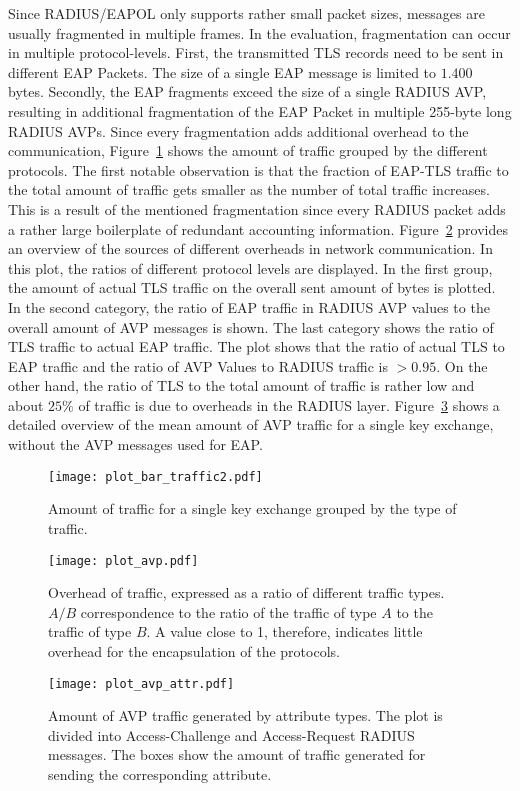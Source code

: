 Since RADIUS/EAPOL only supports rather small packet sizes, messages are usually fragmented in multiple frames. In the evaluation, fragmentation can occur in multiple protocol-levels. First, the transmitted TLS records need to be sent in different \ac{EAP} Packets. The size of a single \ac{EAP} message is limited to \(1.400\) bytes. Secondly, the \ac{EAP} fragments exceed the size of a single RADIUS \ac{AVP}, resulting in additional fragmentation of the \ac{EAP} Packet in multiple 255-byte long RADIUS \acp{AVP}. Since every fragmentation adds additional overhead to the communication, Figure~\ref{fig:plot_bar_traffic2.pdf} shows the amount of traffic grouped by the different protocols. The first notable observation is that the fraction of EAP-TLS traffic to the total amount of traffic gets smaller as the number of total traffic increases. This is a result of the mentioned fragmentation since every RADIUS packet adds a rather large boilerplate of redundant accounting information. Figure~\ref{fig:plot_avp.pdf} provides an overview of the sources of different overheads in network communication. In this plot, the ratios of different protocol levels are displayed. In the first group, the amount of actual TLS traffic on the overall sent amount of bytes is plotted. In the second category, the ratio of \ac{EAP} traffic in RADIUS AVP values to the overall amount of AVP messages is shown. The last category shows the ratio of TLS traffic to actual \ac{EAP} traffic. The plot shows that the ratio of actual TLS to \ac{EAP} traffic and the ratio of AVP Values to RADIUS traffic is \(> 0.95\). On the other hand, the ratio of TLS to the total amount of traffic is rather low and about \(25\%\) of traffic is due to overheads in the RADIUS layer. Figure~\ref{fig:plot_avp_attr.pdf} shows a detailed overview of the mean amount of AVP traffic for a single key exchange, without the AVP messages used for EAP.

\begin{figure}[t]
    \centering\texttt{[image: plot\_bar\_traffic2.pdf]}
    \caption{Amount of traffic for a single key exchange grouped by the type of traffic.}\label{fig:plot_bar_traffic2.pdf}
\end{figure}
\begin{figure}[t]
    \centering\texttt{[image: plot\_avp.pdf]}
    \caption{Overhead of traffic, expressed as a ratio of different traffic types. \(A/B\) correspondence to the ratio of the traffic of type \(A\) to the traffic of type \(B\). A value close to 1, therefore, indicates little overhead for the encapsulation of the protocols.}\label{fig:plot_avp.pdf}
\end{figure}
\begin{figure}[t]
    \centering\texttt{[image: plot\_avp\_attr.pdf]}
    \caption{Amount of AVP traffic generated by attribute types. The plot is divided into Access-Challenge and Access-Request RADIUS messages. The boxes show the amount of traffic generated for sending the corresponding attribute.}\label{fig:plot_avp_attr.pdf}
\end{figure}

